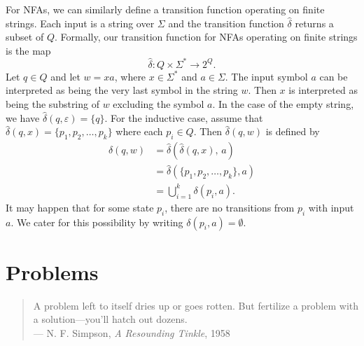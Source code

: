 For NFAs, we can similarly define a transition function operating on
finite strings. Each input is a string over $\Sigma$ and the
transition function $\hat{\delta}$ returns a subset of $Q$. Formally,
our transition function for NFAs operating on finite strings is the
map
\[
\hat{\delta} : Q \times \Sigma^\ast \to 2^Q.
\]
Let $q \in Q$ and let $w = xa$, where $x \in \Sigma^\ast$ and
$a \in \Sigma$. The input symbol $a$ can be interpreted as being the
very last symbol in the string $w$. Then $x$ is interpreted as being the
substring of $w$ excluding the symbol $a$. In the case of the empty
string, we have $\hat{\delta}(q, \varepsilon) = \{q\}$. For the
inductive case, assume that
$\hat{\delta}(q, x) = \{p_1, p_2, \dots, p_k\}$ where each
$p_i \in Q$. Then $\hat{\delta}(q, w)$ is defined by
\begin{align*}
\hat{\delta}(q,w)
&=
\hat{\delta} \left( \hat{\delta}(q,x),\, a \right) \\[4pt]
&=
\hat{\delta} \left( \{p_1, p_2, \dots, p_k\}, a \right) \\[4pt]
&=
\bigcup_{i=1}^k \delta (p_i, a).
\end{align*}
It may happen that for some state $p_i$, there are no transitions from
$p_i$ with input $a$. We cater for this possibility by writing
$\delta(p_i, a) = \emptyset$.



\section{Problems}

\begin{quote}
\footnotesize
A problem left to itself dries up or goes rotten. But fertilize a
problem with a solution---you'll hatch out dozens. \\
\noindent
--- N. F. Simpson, \emph{A Resounding Tinkle}, 1958
\end{quote}

